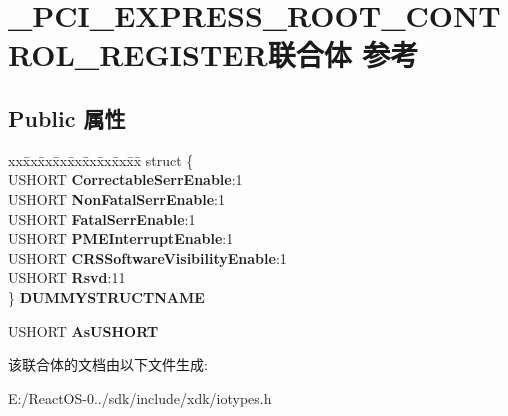 \hypertarget{union___p_c_i___e_x_p_r_e_s_s___r_o_o_t___c_o_n_t_r_o_l___r_e_g_i_s_t_e_r}{}\section{\+\_\+\+P\+C\+I\+\_\+\+E\+X\+P\+R\+E\+S\+S\+\_\+\+R\+O\+O\+T\+\_\+\+C\+O\+N\+T\+R\+O\+L\+\_\+\+R\+E\+G\+I\+S\+T\+E\+R联合体 参考}
\label{union___p_c_i___e_x_p_r_e_s_s___r_o_o_t___c_o_n_t_r_o_l___r_e_g_i_s_t_e_r}
\subsection*{Public 属性}
\begin{DoxyCompactItemize}
\item 
\mbox{\label{union___p_c_i___e_x_p_r_e_s_s___r_o_o_t___c_o_n_t_r_o_l___r_e_g_i_s_t_e_r_a8bb78f1f6b020369e38c0b94bce792f4}} 
\begin{tabbing}
xx\=xx\=xx\=xx\=xx\=xx\=xx\=xx\=xx\=\kill
struct \{\\
\>USHORT {\bfseries CorrectableSerrEnable}:1\\
\>USHORT {\bfseries NonFatalSerrEnable}:1\\
\>USHORT {\bfseries FatalSerrEnable}:1\\
\>USHORT {\bfseries PMEInterruptEnable}:1\\
\>USHORT {\bfseries CRSSoftwareVisibilityEnable}:1\\
\>USHORT {\bfseries Rsvd}:11\\
\} {\bfseries DUMMYSTRUCTNAME}\\

\end{tabbing}\item 
\mbox{\label{union___p_c_i___e_x_p_r_e_s_s___r_o_o_t___c_o_n_t_r_o_l___r_e_g_i_s_t_e_r_a104f8f1e7209d5d6f667c6e0b7075b7d}} 
U\+S\+H\+O\+RT {\bfseries As\+U\+S\+H\+O\+RT}
\end{DoxyCompactItemize}


该联合体的文档由以下文件生成\+:\begin{DoxyCompactItemize}
\item 
E\+:/\+React\+O\+S-\/0../sdk/include/xdk/iotypes.\+h\end{DoxyCompactItemize}
